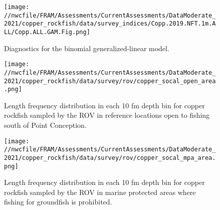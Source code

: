 \documentclass[11pt,
  english,
  a4paper,
]{article}
\begin{document}
\tagmcend\tagstructend


\begin{figure}
\centering
\texttt{[image: //nwcfile/FRAM/Assessments/CurrentAssessments/DataModerate\_2021/copper\_rockfish/data/survey\_indices/Copp.2019.NFT.1m.ALL/Copp.ALL.GAM.Fig.png]}
\caption{Diagnostics for the binomial generalized-linear model.\label{fig:hkl-diag}}
\end{figure}

\tagmcend\tagstructend


\begin{figure}
\centering
\texttt{[image: //nwcfile/FRAM/Assessments/CurrentAssessments/DataModerate\_2021/copper\_rockfish/data/survey/rov/copper\_socal\_open\_area.png]}
\caption{Length frequency distribution in each 10 fm depth bin for copper rockfish sampled by the ROV in reference locations open to fishing south of Point Conception.\label{fig:rov-open}}
\end{figure}

\tagmcend\tagstructend

\clearpage


\begin{figure}
\centering
\texttt{[image: //nwcfile/FRAM/Assessments/CurrentAssessments/DataModerate\_2021/copper\_rockfish/data/survey/rov/copper\_socal\_mpa\_area.png]}
\caption{Length frequency distribution in each 10 fm depth bin for copper rockfish sampled by the ROV in marine protected areas where fishing for groundfish is prohibited.\label{fig:rov-mpa}}
\end{figure}

\tagmcend\tagstructend

\clearpage

\end{document}
